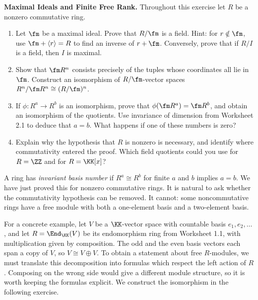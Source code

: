 \documentclass[12pt,reqno]{amsart}
\begin{document}
\begin{problems}
\item\label{p:rank} \textbf{Maximal Ideals and Finite Free Rank.} Throughout this exercise let $R$ be a nonzero commutative ring.
\begin{enumerate}
\item Let $\fm$ be a maximal ideal. Prove that $R/\fm$ is a field. Hint: for $r\notin\fm$, use $\fm+\langle r\rangle=R$ to find an inverse of $r+\fm$. Conversely, prove that if $R/I$ is a field, then $I$ is maximal.
\item Show that $\fm R^n$ consists precisely of the tuples whose coordinates all lie in $\fm$. Construct an isomorphism of $R/\fm$-vector spaces $R^n/\fm R^n\cong(R/\fm)^n$.
\item If $\phi:R^a\to R^b$ is an isomorphism, prove that $\phi(\fm R^a)=\fm R^b$, and obtain an isomorphism of the quotients. Use invariance of dimension from Worksheet 2.1 to deduce that $a=b$. What happens if one of these numbers is zero?
\item Explain why the hypothesis that $R$ is nonzero is necessary, and identify where commutativity entered the proof. Which field quotients could you use for $R=\ZZ$ and for $R=\KK[x]$?
\end{enumerate}
\end{problems}

\hrulefill

A ring has \emph{invariant basis number} if $R^a\cong R^b$ for finite $a$ and $b$ implies $a=b$. We have just proved this for nonzero commutative rings. It is natural to ask whether the commutativity hypothesis can be removed. It cannot: some noncommutative rings have a free module with both a one-element basis and a two-element basis.

For a concrete example, let $V$ be a $\KK$-vector space with countable basis $e_1,e_2,\ldots$, and let $R=\End_{\KK}(V)$ be its endomorphism ring from Worksheet 1.1, with multiplication given by composition. The odd and the even basis vectors each span a copy of $V$, so $V\cong V\oplus V$. To obtain a statement about free $R$-modules, we must translate this decomposition into formulas which respect the left action of $R$. Composing on the wrong side would give a different module structure, so it is worth keeping the formulas explicit. We construct the isomorphism in the following exercise.

\hrulefill
\end{document}
